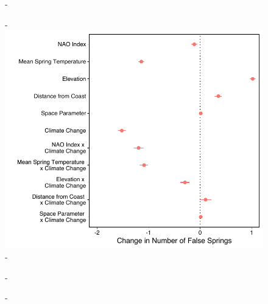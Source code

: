 \documentclass{article}\usepackage[]{graphicx}\usepackage[]{color}
\begin{document}
  
{\begin{figure} [H]
  -\begin{center}
  -\includegraphics[width=16cm]{..//figures/model_output_bern.pdf}
  -\caption{}\label{fig:five}
  -\end{center}
  -\end{figure}}
\end{document}
